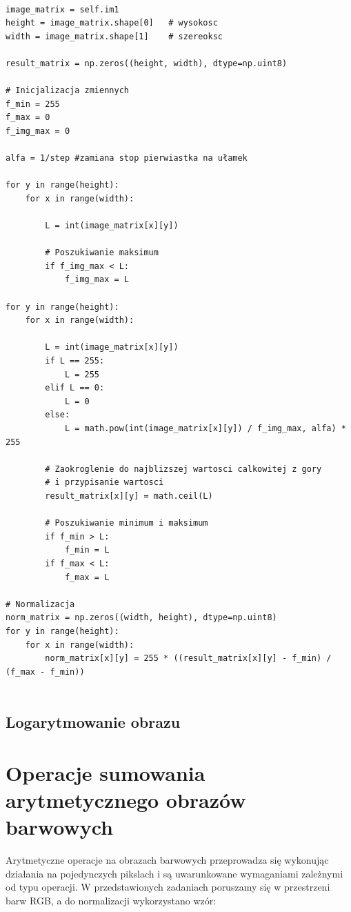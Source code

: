 \documentclass[final,a4paper,openany,12pt]{mwbk}
\begin{document}
\begin{lstlisting}[caption=Pierwiastkowanie obrazu szarego]

image_matrix = self.im1
height = image_matrix.shape[0]   # wysokosc
width = image_matrix.shape[1]    # szereoksc

result_matrix = np.zeros((height, width), dtype=np.uint8)

# Inicjalizacja zmiennych
f_min = 255
f_max = 0
f_img_max = 0

alfa = 1/step #zamiana stop pierwiastka na ułamek

for y in range(height):
    for x in range(width):  
        
        L = int(image_matrix[x][y])

        # Poszukiwanie maksimum
        if f_img_max < L:
            f_img_max = L

for y in range(height):
    for x in range(width):  
        
        L = int(image_matrix[x][y])
        if L == 255:
            L = 255
        elif L == 0:
            L = 0
        else:
            L = math.pow(int(image_matrix[x][y]) / f_img_max, alfa) * 255

        # Zaokroglenie do najblizszej wartosci calkowitej z gory
        # i przypisanie wartosci
        result_matrix[x][y] = math.ceil(L)

        # Poszukiwanie minimum i maksimum
        if f_min > L:
            f_min = L
        if f_max < L:
            f_max = L

# Normalizacja
norm_matrix = np.zeros((width, height), dtype=np.uint8)
for y in range(height):
    for x in range(width):
        norm_matrix[x][y] = 255 * ((result_matrix[x][y] - f_min) / (f_max - f_min))
        

\end{lstlisting}

\section {Logarytmowanie obrazu}

\chapter{Operacje sumowania arytmetycznego obrazów barwowych}

Arytmetyczne operacje na obrazach barwowych przeprowadza się wykonując działania na pojedynczych pikslach i są uwarunkowane wymaganiami zależnymi od typu operacji. 
W przedstawionych zadaniach poruszamy się w przestrzeni barw RGB, a do normalizacji wykorzystano wzór:
\end{document}
